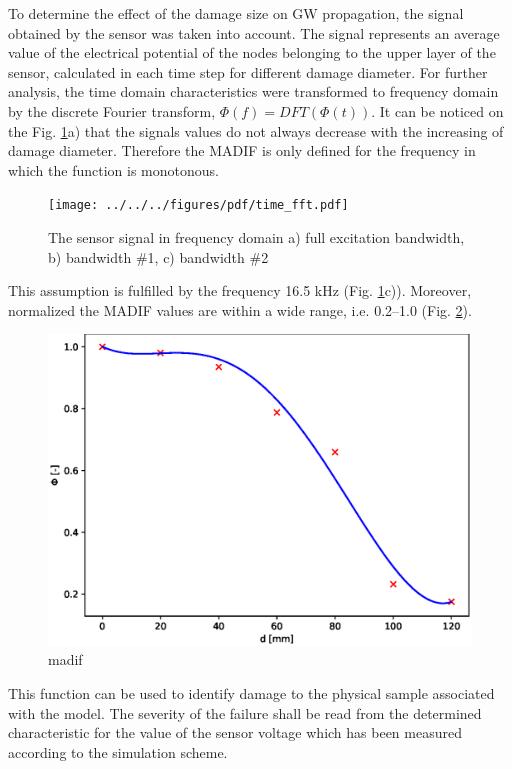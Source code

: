 \documentclass[a4paper,12pt]{article}
\begin{document}
{To determine the effect of the damage size on GW propagation, the signal obtained by the sensor was taken into account.
The signal represents an average value of the electrical potential of the nodes belonging to the upper layer of the sensor, calculated in each time step for different damage diameter.
For further analysis, the time domain characteristics were transformed to frequency domain by the discrete Fourier transform, \(\Phi(f)=DFT(\Phi(t))\).
It can be noticed on the Fig. \ref{fig:signals}a) that the signals values do not always decrease with the increasing of damage diameter.
Therefore the MADIF is only defined for the frequency in which the function is monotonous.
\begin{figure}
	\begin{center}
		\texttt{[image: ../../../figures/pdf/time\_fft.pdf]}
	\end{center}
	\caption{The sensor signal in frequency domain a) full excitation bandwidth, b) bandwidth \#1, c) bandwidth \#2}
	\label{fig:signals}
\end{figure}
This assumption is fulfilled by the frequency 16.5 kHz (Fig. \ref{fig:signals}c)).
Moreover, normalized the MADIF values are within a wide range, i.e. 0.2--1.0 (Fig. \ref{fig:madif}).
\begin{figure}
	\begin{center}
		\includegraphics[width=1\linewidth]{../../../figures/eps/madif.eps}
	\end{center}
	\caption{madif}
	\label{fig:madif}
\end{figure}
This function can be used to identify damage to the physical sample associated with the model.
The severity of the failure shall be read from the determined characteristic for the value of the sensor voltage which has been measured according to the simulation scheme.

}
\end{document}
